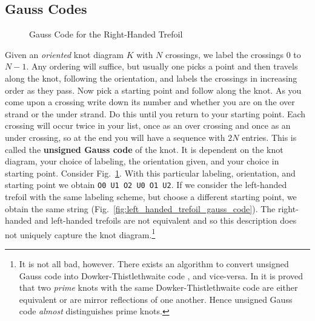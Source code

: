     \subsection{Gauss Codes}
        \begin{figure}
            \centering
            \caption{Gauss Code for the Right-Handed Trefoil}
            \label{fig:right_handed_trefoil_gauss_code}
        \end{figure}
        Given an \textit{oriented} knot diagram $K$ with $N$ crossings, we
        label the crossings $0$ to $N-1$. Any ordering will suffice, but
        usually one picks a point and then travels along the knot, following
        the orientation, and labels the crossings in increasing order as they
        pass. Now pick a starting point and follow along the knot. As you
        come upon a crossing write down its number and whether you are on the
        over strand or the under strand. Do this until you return to your
        starting point. Each crossing will occur twice in your list, once as an
        over crossing and once as an under crossing, so at the end you will
        have a sequence with $2N$ entries. This is called the
        \textbf{unsigned Gauss code} of the knot. It is dependent on the
        knot diagram, your choice of labeling, the orientation given, and your
        choice in starting point. Consider
        Fig.~\ref{fig:right_handed_trefoil_gauss_code}. With this particular
        labeling, orientation, and starting point we obtain
        \texttt{O0 U1 O2 U0 O1 U2}. If we consider the left-handed trefoil with
        the same labeling scheme, but choose a different starting point, we
        obtain the same string (Fig.~\ref{fig:left_handed_trefoil_gauss_code}).
        The right-handed and left-handed trefoils are
        not equivalent \cite[p.~200-204]{DehnGroupTheoryAndTopology} and so
        this description does not uniquely capture the knot diagram.\footnote{%
            It is not all bad, however. There exists an algorithm to
            convert unsigned Gauss code into Dowker-Thistlethwaite code
            \cite{KatlasDTCode}, and vice-versa. In \cite{DOWKER198319} it is
            proved that two \textit{prime} knots with the same
            Dowker-Thistlethwaite code are either equivalent or are mirror
            reflections of one another. Hence unsigned Gauss code
            \textit{almost} distinguishes prime knots.
        }
